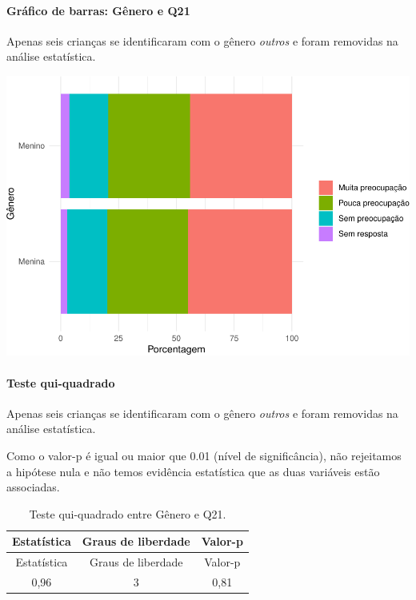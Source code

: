 \documentclass[]{article}
\let\oldparagraph\paragraph
\renewcommand{\paragraph}[1]{\oldparagraph{#1}\mbox{}}
\begin{document}
\hypertarget{gruxe1fico-de-barras-guxeanero-e-q21}{%
\paragraph{Gráfico de barras: Gênero e Q21}\label{gruxe1fico-de-barras-guxeanero-e-q21}}

Apenas seis crianças se identificaram com o gênero \emph{outros} e foram removidas na análise estatística.

\begin{center}\includegraphics[width=0.75\linewidth]{relatorio_covid19_files/figure-latex/unnamed-chunk-436-1} \end{center}

\hypertarget{teste-qui-quadrado-38}{%
\paragraph{Teste qui-quadrado}\label{teste-qui-quadrado-38}}

Apenas seis crianças se identificaram com o gênero \emph{outros} e foram removidas na análise estatística.

Como o valor-p é igual ou maior que 0.01 (nível de significância), não rejeitamos a hipótese nula e não temos evidência estatística que as duas variáveis estão associadas.

\begin{longtable}[]{@{}ccc@{}}
\caption{\label{tab:unnamed-chunk-438}Teste qui-quadrado entre Gênero e Q21.}\tabularnewline
\toprule
Estatística & Graus de liberdade & Valor-p\tabularnewline
\midrule
\endfirsthead
\toprule
Estatística & Graus de liberdade & Valor-p\tabularnewline
\midrule
\endhead
0,96 & 3 & 0,81\tabularnewline
\bottomrule
\end{longtable}

\cleardoublepage
\end{document}
